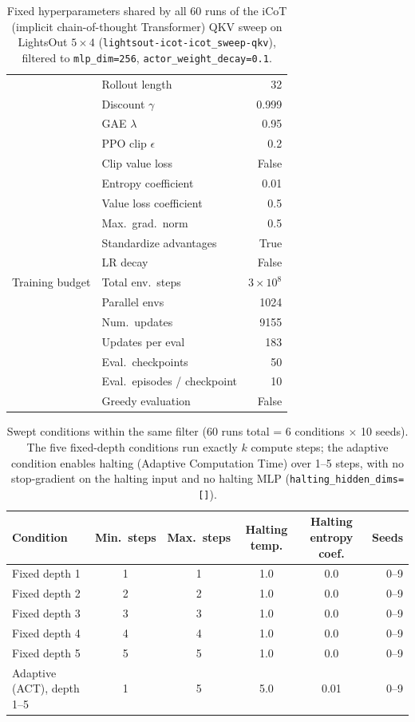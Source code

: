 \begin{table}[t]
\begin{tabular}{llr}
  & Rollout length & 32 \\
  & Discount $\gamma$ & 0.999 \\
  & GAE $\lambda$ & 0.95 \\
  & PPO clip $\epsilon$ & 0.2 \\
  & Clip value loss & False \\
  & Entropy coefficient & 0.01 \\
  & Value loss coefficient & 0.5 \\
  & Max.\ grad.\ norm & 0.5 \\
  & Standardize advantages & True \\
  & LR decay & False \\
\midrule
Training budget
  & Total env.\ steps & $3\times10^{8}$ \\
  & Parallel envs & 1024 \\
  & Num.\ updates & 9155 \\
  & Updates per eval & 183 \\
  & Eval.\ checkpoints & 50 \\
  & Eval.\ episodes / checkpoint & 10 \\
  & Greedy evaluation & False \\
\bottomrule
\end{tabular}
\caption{Fixed hyperparameters shared by all 60 runs of the iCoT (implicit
chain-of-thought Transformer) QKV sweep on LightsOut $5\times4$
(\texttt{lightsout-icot-icot\_sweep-qkv}), filtered to
\texttt{mlp\_dim=256}, \texttt{actor\_weight\_decay=0.1}.}
\label{tab:lightsout_icot_qkv_fixed_hyperparams}
\end{table}

\begin{table}[t]
\centering
\begin{tabular}{lccccr}
\toprule
Condition & Min.\ steps & Max.\ steps & Halting temp. & Halting entropy coef. & Seeds \\
\midrule
Fixed depth 1 & 1 & 1 & 1.0 & 0.0 & 0--9 \\
Fixed depth 2 & 2 & 2 & 1.0 & 0.0 & 0--9 \\
Fixed depth 3 & 3 & 3 & 1.0 & 0.0 & 0--9 \\
Fixed depth 4 & 4 & 4 & 1.0 & 0.0 & 0--9 \\
Fixed depth 5 & 5 & 5 & 1.0 & 0.0 & 0--9 \\
Adaptive (ACT), depth 1--5 & 1 & 5 & 5.0 & 0.01 & 0--9 \\
\bottomrule
\end{tabular}
\caption{Swept conditions within the same filter (60 runs total = 6
conditions $\times$ 10 seeds). The five fixed-depth conditions run exactly
$k$ compute steps; the adaptive condition enables halting (Adaptive
Computation Time) over 1--5 steps, with no stop-gradient on the halting
input and no halting MLP (\texttt{halting\_hidden\_dims=[]}).}
\label{tab:lightsout_icot_qkv_swept_hyperparams}
\end{table}
